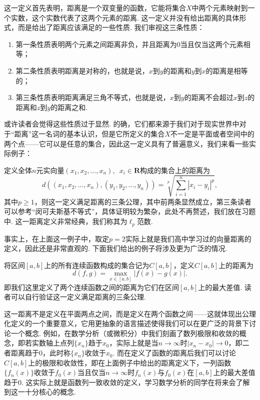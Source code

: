 这一定义首先表明，距离是一个双变量的函数，它能将集合$X$中两个元素映射到一个实数，这个实数代表了这两个元素的距离. 这一定义并没有给出距离的具体形式，而是给出了距离应该满足的一些性质. 我们审视这三条性质：
\begin{enumerate}
    \item 第一条性质表明两个元素之间距离非负，并且距离为0当且仅当这两个元素相等；

    \item 第二条性质表明距离是对称的，也就是说，$x$到$y$的距离和$y$到$x$的距离是相等的；

    \item 第三条性质表明距离满足三角不等式，也就是说，$x$到$y$的距离不会超过$x$到$z$的距离和$z$到$y$的距离之和.
\end{enumerate}

或许读者会觉得这些性质过于显然. 的确，它们都来源于我们对于现实世界中对于``距离''这一名词的基本认识，但是它所定义的集合$X$不一定是平面或者空间中的两个点——它可以是任意的集合，因此这一定义具有了普遍意义，我们来看一些实际例子：

\begin{example}{}{}
    定义全体$n$元实向量$(x_1,x_2,\ldots,x_n),\enspace x_i\in \mathbf{R}$构成的集合上的距离为
    \[d((x_1,x_2,\ldots,x_n),(y_1,y_2,\ldots,y_n))=\sqrt[p]{\sum_{i=1}^n|x_i-y_i|^p},\]
    其中$p \geqslant 1$，则这一定义满足距离的三条公理，其中前两条显然成立，第三条读者可以参考``闵可夫斯基不等式''，具体证明较为繁杂，此处不再赘述，我们放在习题中. 这一距离定义非常经典，我们称其为$\ell_p$范数.
\end{example}

事实上，在上面这一例子中，取定$p=2$实际上就是我们高中学习过的向量距离的定义，因此还是非常直观的. 下面我们给出的例子将涉及更为广泛的情况.

\begin{example}{}{}
    将区间$[a,b]$上的所有连续函数构成的集合记为$C[a,b]$，定义$C[a,b]$上的距离为
    \[d(f,g)=\max_{x\in [a,b]}|f(x)-g(x)|.\]
    即我们这里定义了两个连续函数之间的距离为它们在区间$[a,b]$上的最大差值. 读者可以自行验证这一定义满足距离的三条公理.
\end{example}

这一距离不是定义在平面两点之间，而是定义在两个函数之间——这就体现出公理化定义的一个重要意义，它用更抽象的语言描述使得我们可以在更广泛的背景下讨论一个概念. 例如，在数学分析（或微积分）中我们刻画了数列极限和收敛的概念，即若实数轴上点列$\{x_n\}$趋于$x_0$，实际上就是当$n\to\infty$时$|x_n-x_0|\to 0$，即二者距离趋于0，此时称$\{x_n\}$收敛于$x_0$. 而在定义了函数的距离后我们可以讨论$C[a,b]$上的极限和收敛性，即在上面例子中给出的距离定义下，一列函数$\{f_n(x)\}$收敛于$f_0(x)$当且仅当$n\to\infty$时$f_n(x)$与$f_0(x)$在$[a,b]$上的最大差值趋于0. 这实际上就是函数列一致收敛的定义，学习数学分析的同学在将来会了解到这一十分核心的概念.

